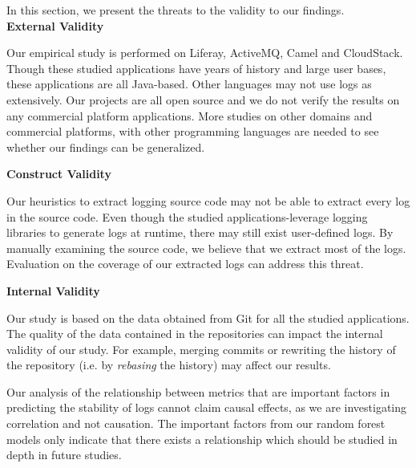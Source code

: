 In this section, we present the threats to the validity to our findings. \\


\noindent \textbf{External Validity}

Our empirical study is performed on Liferay, ActiveMQ, Camel and CloudStack. Though these studied applications have years of history and large user bases, these applications are all Java-based. Other languages may not use logs as extensively. Our projects are all open source and we do not verify the results on any commercial platform applications. More studies on other domains and commercial platforms, with other programming languages are needed to see whether our findings can be generalized. 



\noindent \textbf{Construct Validity}


Our heuristics to extract logging source code may not be able to extract every log in the source code. Even though the studied applications-leverage logging libraries to generate logs at runtime, there may still exist user-defined logs. By manually examining the source code, we believe that we extract most of the logs. Evaluation on the coverage of our extracted logs can address this threat.





\noindent \textbf{Internal Validity}

Our study is based on the data obtained from Git for all the studied applications. The quality of the data contained in the repositories can impact the internal validity of our study. For example, merging commits or rewriting the history of the repository (i.e. by \emph{rebasing} the history) may affect our results.  

Our analysis of the relationship between metrics that are important factors in predicting the stability of logs cannot claim causal effects, as we are investigating correlation and not causation. The important factors from our random forest models only indicate that there exists a relationship which should be studied in depth in future studies. 



